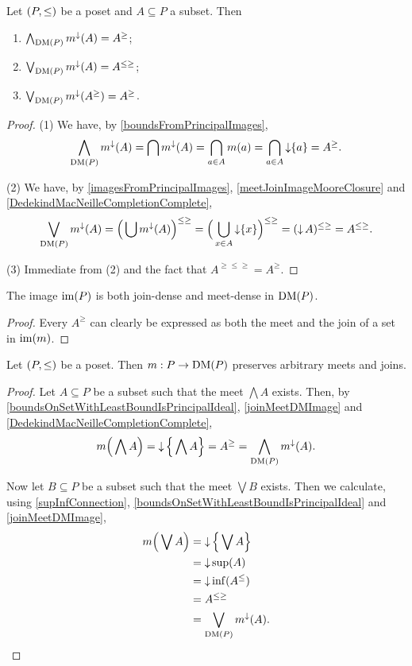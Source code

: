 \begin{lemma} \label{joinMeetDMImage}
Let $\sSet{P, \leq}$ be a poset and $A\subseteq P$ a subset. Then
\begin{enumerate}
\item $\bigwedge_{\operatorname{DM}(P)} m^\downarrow(A) = A^\geq$;
\item $\bigvee_{\operatorname{DM}(P)} m^\downarrow(A) = A^{\leq\geq}$;
\item $\bigvee_{\operatorname{DM}(P)} m^\downarrow(A^\geq) = A^{\geq}$.
\end{enumerate}
\end{lemma}
\begin{proof}
(1) We have, by \ref{boundsFromPrincipalImages},
\[ \bigwedge_{\operatorname{DM}(P)}m^\downarrow(A) = \bigcap m^\downarrow(A) = \bigcap_{a\in A}m(a) = \bigcap_{a\in A}\operatorname{\downarrow}\{a\} = A^\geq. \]

(2) We have, by \ref{imagesFromPrincipalImages}, \ref{meetJoinImageMooreClosure} and \ref{DedekindMacNeilleCompletionComplete},
\[ \bigvee_{\operatorname{DM}(P)} m^{\downarrow}(A) = \Big(\bigcup m^\downarrow(A)\Big)^{\leq\geq} = \Big(\bigcup_{x\in A} \operatorname{\downarrow}\{x\}\Big)^{\leq\geq} = (\operatorname{\downarrow} A)^{\leq\geq} = A^{\leq\geq}. \]

(3) Immediate from (2) and the fact that $A^{\geq\leq\geq} = A^\geq$.
\end{proof}
\begin{corollary}
The image $\operatorname{im}(P)$ is both join-dense and meet-dense in $\operatorname{DM}(P)$.
\end{corollary}
\begin{proof}
Every $A^\geq$ can clearly be expressed as both the meet and the join of a set in $\operatorname{im}(m)$.
\end{proof}

\begin{proposition}
Let $\sSet{P, \leq}$ be a poset. Then $m: P \to \operatorname{DM}(P)$ preserves arbitrary meets and joins.
\end{proposition}
\begin{proof}
Let $A\subseteq P$ be a subset such that the meet $\bigwedge A$ exists. Then, by \ref{boundsOnSetWithLeastBoundIsPrincipalIdeal}, \ref{joinMeetDMImage} and \ref{DedekindMacNeilleCompletionComplete},
\[ m\Big(\bigwedge A\Big) = \operatorname{\downarrow}\Big\{\bigwedge A\Big\} = A^\geq = \bigwedge_{\operatorname{DM}(P)}m^\downarrow(A). \]

Now let $B\subseteq P$ be a subset such that the meet $\bigvee B$ exists. Then we calculate, using \ref{supInfConnection}, \ref{boundsOnSetWithLeastBoundIsPrincipalIdeal} and \ref{joinMeetDMImage},
\begin{align*}
m\Big(\bigvee A\Big) &= \operatorname{\downarrow}\Big\{\bigvee A\Big\} \\
&= \operatorname{\downarrow} \sup(A) \\
&= \operatorname{\downarrow} \inf(A^\leq) \\
&= A^{\leq\geq} \\
&= \bigvee_{\operatorname{DM}(P)} m^{\downarrow}(A).
\end{align*}
\end{proof}

